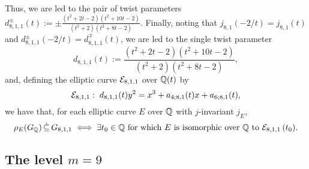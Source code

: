 Thus, we are led to the pair of twist parameters
$
d_{8,1,1}^{\pm}(t) := \pm \frac{(t^2 +2t-2)(t^2+10t-2)}{(t^2+2)(t^2+8t-2)}.
$
Finally, noting that $j_{8,1}(-2/t) = j_{8,1}(t)$ and $d_{8,1,1}^{\pm}(-2/t) = d_{8,1,1}^{\mp}(t)$, we are led to the single twist parameter 
\[
d_{8,1,1}(t) := \frac{(t^2 +2t-2)(t^2+10t-2)}{(t^2+2)(t^2+8t-2)},
\]
and, defining the elliptic curve $\mathcal{E}_{8,1,1}$ over $\mathbb{Q}(t)$ by
\[
\mathcal{E}_{8,1,1} : \; d_{8,1,1}(t) y^2 = x^3 + a_{4;8,1}(t)x + a_{6;8,1}(t),
\]
we have that, for each elliptic curve $E$ over $\mathbb{Q}$ with $j$-invariant $j_E$,
\[
\rho_{E}(G_{\mathbb{Q}}) \, \dot\subseteq \, G_{8,1,1} \; \Longleftrightarrow \; \exists t_0 \in \mathbb{Q} \text{ for which $E$ is isomorphic over $\mathbb{Q}$ to $\mathcal{E}_{8,1,1}\left( t_0 \right)$.}
\]

\medskip

\subsection{The level \texorpdfstring{$m=9$}.}

